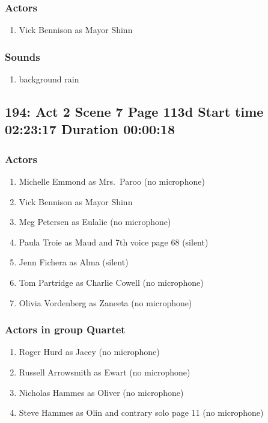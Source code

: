 \subsubsection{Actors}
\begin{enumerate}
\item Vick Bennison as Mayor Shinn
\end{enumerate}

\subsubsection{Sounds}
\begin{enumerate}
\item background rain
\end{enumerate}
\subsection{194: Act 2 Scene 7 Page 113d Start time 02:23:17 Duration 00:00:18}

\subsubsection{Actors}
\begin{enumerate}
\item Michelle Emmond as Mrs.~Paroo (no microphone)
\item Vick Bennison as Mayor Shinn
\item Meg Petersen as Eulalie (no microphone)
\item Paula Troie as Maud and 7th voice page 68 (silent)
\item Jenn Fichera as Alma (silent)
\item Tom Partridge as Charlie Cowell (no microphone)
\item Olivia Vordenberg as Zaneeta (no microphone)
\end{enumerate}
\subsubsection{Actors in group Quartet}
\begin{enumerate}
\item Roger Hurd as Jacey (no microphone)
\item Russell Arrowsmith as Ewart (no microphone)
\item Nicholas Hammes as Oliver (no microphone)
\item Steve Hammes as Olin and contrary solo page 11 (no microphone)
\end{enumerate}
